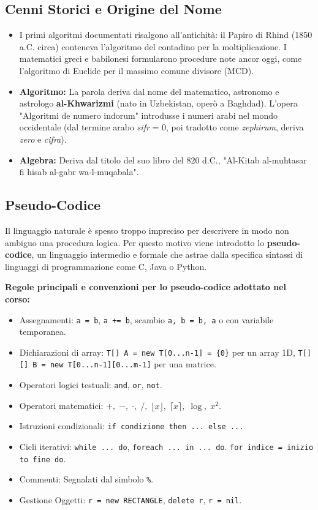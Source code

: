 \documentclass[12pt, a4paper]{article}
\begin{document}
\subsection{Cenni Storici e Origine del Nome}
\begin{itemize}
\item I primi algoritmi documentati risalgono all'antichità: il Papiro di Rhind (1850 a.C. circa) conteneva l'algoritmo del contadino per la moltiplicazione. I matematici greci e babilonesi formularono procedure note ancor oggi, come l'algoritmo di Euclide per il massimo comune divisore (MCD).
\item \textbf{Algoritmo:} La parola deriva dal nome del matematico, astronomo e astrologo \textbf{al-Khwarizmi} (nato in Uzbekistan, operò a Baghdad). L'opera "Algoritmi de numero indorum" introdusse i numeri arabi nel mondo occidentale (dal termine arabo \textit{sifr} = 0, poi tradotto come \textit{zephirum}, deriva \textit{zero} e \textit{cifra}).
\item \textbf{Algebra:} Deriva dal titolo del suo libro del 820 d.C., "Al-Kitab al-muhtasar fi hisab al-gabr wa-l-muqabala".
\end{itemize}

\subsection{Pseudo-Codice}
Il linguaggio naturale è spesso troppo impreciso per descrivere in modo non ambiguo una procedura logica. Per questo motivo viene introdotto lo \textbf{pseudo-codice}, un linguaggio intermedio e formale che astrae dalla specifica sintassi di linguaggi di programmazione come C, Java o Python.

\textbf{Regole principali e convenzioni per lo pseudo-codice adottato nel corso:}
\begin{itemize}
\item Assegnamenti: \verb|a = b|, \verb|a += b|, scambio \verb|a, b = b, a| o con variabile temporanea.
\item Dichiarazioni di array: \verb|T[] A = new T[0...n-1] = {0}| per un array 1D, \verb|T[][] B = new T[0...n-1][0...m-1]| per una matrice.
\item Operatori logici testuali: \verb|and|, \verb|or|, \verb|not|.
\item Operatori matematici: $+,\; -,\; \cdot,\; /,\; \lfloor x \rfloor,\; \lceil x \rceil,\; \log,\; x^2$.
\item Istruzioni condizionali: \verb|if condizione then ... else ...|
\item Cicli iterativi: \verb|while ... do|, \verb|foreach ... in ... do|. \verb|for indice = inizio to fine do|.
\item Commenti: Segnalati dal simbolo \verb|%|.
\item Gestione Oggetti: \verb|r = new RECTANGLE|, \verb|delete r|, \verb|r = nil|.
\end{itemize}
\end{document}
